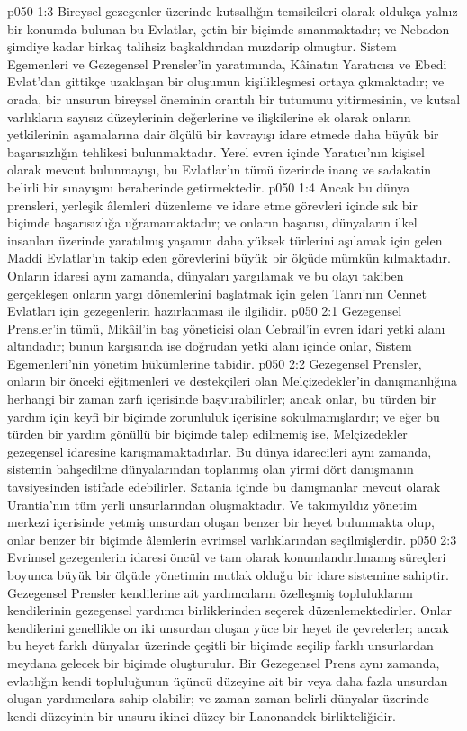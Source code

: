\vs p050 1:3 Bireysel gezegenler üzerinde kutsallığın temsilcileri olarak oldukça yalnız bir konumda bulunan bu Evlatlar, çetin bir biçimde sınanmaktadır; ve Nebadon şimdiye kadar birkaç talihsiz başkaldırıdan muzdarip olmuştur. Sistem Egemenleri ve Gezegensel Prensler’in yaratımında, Kâinatın Yaratıcısı ve Ebedi Evlat’dan gittikçe uzaklaşan bir oluşumun kişilikleşmesi ortaya çıkmaktadır; ve orada, bir unsurun bireysel öneminin orantılı bir tutumunu yitirmesinin, ve kutsal varlıkların sayısız düzeylerinin değerlerine ve ilişkilerine ek olarak onların yetkilerinin aşamalarına dair ölçülü bir kavrayışı idare etmede daha büyük bir başarısızlığın tehlikesi bulunmaktadır. Yerel evren içinde Yaratıcı’nın kişisel olarak mevcut bulunmayışı, bu Evlatlar’ın tümü üzerinde inanç ve sadakatin belirli bir sınayışını beraberinde getirmektedir.
\vs p050 1:4 Ancak bu dünya prensleri, yerleşik âlemleri düzenleme ve idare etme görevleri içinde sık bir biçimde başarısızlığa uğramamaktadır; ve onların başarısı, dünyaların ilkel insanları üzerinde yaratılmış yaşamın daha yüksek türlerini aşılamak için gelen Maddi Evlatlar’ın takip eden görevlerini büyük bir ölçüde mümkün kılmaktadır. Onların idaresi aynı zamanda, dünyaları yargılamak ve bu olayı takiben gerçekleşen onların yargı dönemlerini başlatmak için gelen Tanrı’nın Cennet Evlatları için gezegenlerin hazırlanması ile ilgilidir.
\vs p050 2:1 Gezegensel Prensler’in tümü, Mikâil’in baş yöneticisi olan Cebrail’in evren idari yetki alanı altındadır; bunun karşısında ise doğrudan yetki alanı içinde onlar, Sistem Egemenleri’nin yönetim hükümlerine tabidir.
\vs p050 2:2 Gezegensel Prensler, onların bir önceki eğitmenleri ve destekçileri olan Melçizedekler’in danışmanlığına herhangi bir zaman zarfı içerisinde başvurabilirler; ancak onlar, bu türden bir yardım için keyfi bir biçimde zorunluluk içerisine sokulmamışlardır; ve eğer bu türden bir yardım gönüllü bir biçimde talep edilmemiş ise, Melçizedekler gezegensel idaresine karışmamaktadırlar. Bu dünya idarecileri aynı zamanda, sistemin bahşedilme dünyalarından toplanmış olan yirmi dört danışmanın tavsiyesinden istifade edebilirler. Satania içinde bu danışmanlar mevcut olarak Urantia’nın tüm yerli unsurlarından oluşmaktadır. Ve takımyıldız yönetim merkezi içerisinde yetmiş unsurdan oluşan benzer bir heyet bulunmakta olup, onlar benzer bir biçimde âlemlerin evrimsel varlıklarından seçilmişlerdir.
\vs p050 2:3 Evrimsel gezegenlerin idaresi öncül ve tam olarak konumlandırılmamış süreçleri boyunca büyük bir ölçüde yönetimin mutlak olduğu bir idare sistemine sahiptir. Gezegensel Prensler kendilerine ait yardımcıların özelleşmiş topluluklarını kendilerinin gezegensel yardımcı birliklerinden seçerek düzenlemektedirler. Onlar kendilerini genellikle on iki unsurdan oluşan yüce bir heyet ile çevrelerler; ancak bu heyet farklı dünyalar üzerinde çeşitli bir biçimde seçilip farklı unsurlardan meydana gelecek bir biçimde oluşturulur. Bir Gezegensel Prens aynı zamanda, evlatlığın kendi topluluğunun üçüncü düzeyine ait bir veya daha fazla unsurdan oluşan yardımcılara sahip olabilir; ve zaman zaman belirli dünyalar üzerinde kendi düzeyinin bir unsuru ikinci düzey bir Lanonandek birlikteliğidir.

